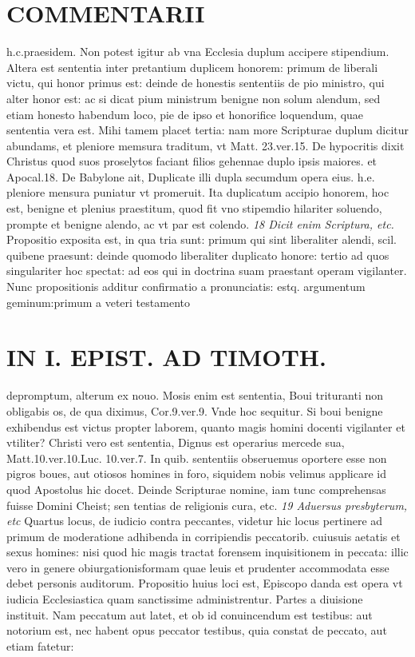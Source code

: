\documentclass{article}
\begin{document}
\begin{pages}
\section*{COMMENTARII }
\marginpar{[ p.132 ]}\pstart h.c.praesidem. Non potest igitur ab vna Ecclesia duplum accipere stipendium. Altera est sententia inter pretantium duplicem honorem: primum de liberali victu, qui honor primus est: deinde de honestis sententiis de pio ministro, qui alter honor est: ac si dicat pium ministrum benigne non solum alendum, sed etiam honesto habendum loco, pie de ipso et honorifice loquendum, quae sententia vera est. Mihi tamem placet tertia: nam more Scripturae duplum dicitur abundams, et pleniore memsura traditum, vt Matt. 23.ver.15. De hypocritis dixit Christus quod suos proselytos faciant filios gehennae duplo ipsis maiores. et Apocal.18. De Babylone ait, Duplicate illi dupla secumdum opera eius. h.e. pleniore mensura puniatur vt promeruit. Ita duplicatum accipio honorem, hoc est, benigne et plenius praestitum, quod fit vno stipemdio hilariter soluendo, prompte et benigne alendo, ac vt par est colendo.  \pend
\textit{18 Dicit enim Scriptura, etc. }\pstart Propositio exposita est, in qua tria sunt: primum qui sint liberaliter alendi, scil. quibene praesunt: deinde quomodo liberaliter duplicato honore: tertio ad quos singulariter hoc spectat: ad eos qui in doctrina suam praestant operam vigilanter. Nunc propositionis additur confirmatio a pronunciatis: estq. argumentum geminum:primum a veteri testamento  \pend
\section*{IN I. EPIST. AD TIMOTH. }
\marginpar{[ p.133 ]}\pstart depromptum, alterum ex nouo. Mosis enim est sententia, Boui trituranti non obligabis os, de qua diximus, Cor.9.ver.9. Vnde hoc sequitur. Si boui benigne exhibendus est victus propter laborem, quanto magis homini docenti vigilanter et vtiliter? Christi vero est sententia, Dignus est operarius mercede sua, Matt.10.ver.10.Luc. 10.ver.7. In quib. sententiis obseruemus oportere esse non pigros boues, aut otiosos homines in foro, siquidem nobis velimus applicare id quod Apostolus hic docet. Deinde Scripturae nomine, iam tunc comprehensas fuisse Domini Cheist; sen tentias de religionis cura, etc.  \pend
\textit{19 Aduersus presbyterum, etc }\pstart Quartus locus, de iudicio contra peccantes, videtur hic locus pertinere ad primum de moderatione adhibenda in corripiendis peccatorib. cuiusuis aetatis et sexus homines: nisi quod hic magis tractat forensem inquisitionem in peccata: illic vero in genere obiurgationisformam quae leuis et prudenter accommodata esse debet personis auditorum.  \pend\pstart Propositio huius loci est, Episcopo danda est opera vt iudicia Ecclesiastica quam sanctissime administrentur.  \pend\pstart Partes a diuisione instituit. Nam peccatum aut latet, et ob id conuincendum est testibus: aut notorium est, nec habent opus peccator testibus, quia constat de peccato, aut etiam fatetur:  \pend

\end{pages}
\end{document}
